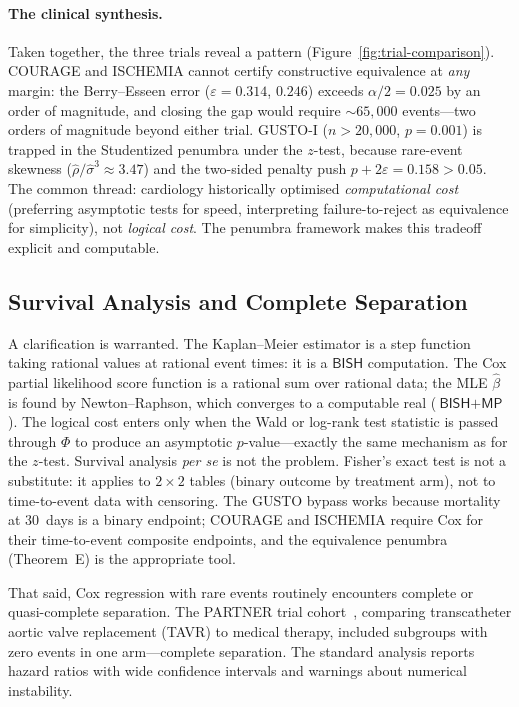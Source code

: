 \documentclass[11pt,a4paper]{article}
\theoremstyle{plain}
\theoremstyle{definition}
\newcommand{\BISH}{\textsf{BISH}}
\newcommand{\MP}{\textsf{MP}}
\renewcommand{\Phi}{\varPhi}
\begin{document}
\paragraph{The clinical synthesis.}  Taken together, the three trials reveal a pattern (Figure~\ref{fig:trial-comparison}).  COURAGE and ISCHEMIA cannot certify constructive equivalence at \emph{any} margin: the Berry--Esseen error ($\varepsilon = 0.314$, $0.246$) exceeds $\alpha/2 = 0.025$ by an order of magnitude, and closing the gap would require $\sim\!65{,}000$ events---two orders of magnitude beyond either trial.  GUSTO-I ($n > 20{,}000$, $p = 0.001$) is trapped in the Studentized penumbra under the $z$-test, because rare-event skewness ($\hat\rho/\hat\sigma^3 \approx 3.47$) and the two-sided penalty push $p + 2\varepsilon = 0.158 > 0.05$.  The common thread: cardiology historically optimised \emph{computational cost} (preferring asymptotic tests for speed, interpreting failure-to-reject as equivalence for simplicity), not \emph{logical cost}.  The penumbra framework makes this tradeoff explicit and computable.

\subsection{Survival Analysis and Complete Separation}

A clarification is warranted.  The Kaplan--Meier estimator is a step function taking rational values at rational event times: it is a $\BISH$ computation.  The Cox partial likelihood score function is a rational sum over rational data; the MLE $\hat\beta$ is found by Newton--Raphson, which converges to a computable real ($\BISH + \MP$).  The logical cost enters only when the Wald or log-rank test statistic is passed through $\Phi$ to produce an asymptotic $p$-value---exactly the same mechanism as for the $z$-test.  Survival analysis \emph{per se} is not the problem.  Fisher's exact test is not a substitute: it applies to $2 \times 2$ tables (binary outcome by treatment arm), not to time-to-event data with censoring.  The GUSTO bypass works because mortality at 30~days is a binary endpoint; COURAGE and ISCHEMIA require Cox for their time-to-event composite endpoints, and the equivalence penumbra (Theorem~E) is the appropriate tool.

That said, Cox regression with rare events routinely encounters complete or quasi-complete separation.  The PARTNER trial cohort~\cite{leon-partner}, comparing transcatheter aortic valve replacement (TAVR) to medical therapy, included subgroups with zero events in one arm---complete separation.  The standard analysis reports hazard ratios with wide confidence intervals and warnings about numerical instability.
\end{document}
